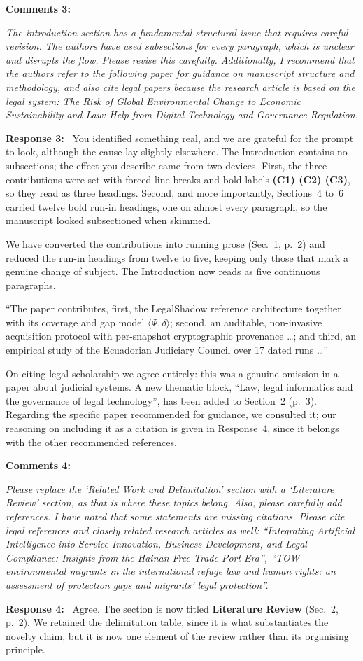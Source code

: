 \documentclass[10pt,a4paper]{article}
\newcommand{\rev}[1]{\textcolor{revred}{#1}}
\newenvironment{revcomment}
  {\begin{mdframed}[backgroundcolor=cmtbg, linecolor=cmtrule, linewidth=0.5pt,
     innertopmargin=5pt, innerbottommargin=5pt, innerleftmargin=7pt,
     innerrightmargin=7pt, skipabove=5pt, skipbelow=5pt]\small\itshape}
  {\end{mdframed}}
\newcommand{\cmt}[2]{\noindent\textbf{Comments #1:}\begin{revcomment}#2\end{revcomment}}
\newcommand{\rsp}[1]{\noindent\textbf{Response #1:}\ }
\begin{document}
\cmt{3}{The introduction section has a fundamental structural issue that requires careful revision. The authors have used subsections for every paragraph, which is unclear and disrupts the flow. Please revise this carefully. Additionally, I recommend that the authors refer to the following paper for guidance on manuscript structure and methodology, and also cite legal papers because the research article is based on the legal system: \emph{The Risk of Global Environmental Change to Economic Sustainability and Law: Help from Digital Technology and Governance Regulation}.}
\rsp{3} You identified something real, and we are grateful for the prompt to look, although the cause lay slightly elsewhere. The Introduction contains no subsections; the effect you describe came from two devices. First, the three contributions were set with forced line breaks and bold labels \textbf{(C1) (C2) (C3)}, so they read as three headings. Second, and more importantly, Sections~4 to~6 carried twelve bold run-in headings, one on almost every paragraph, so the manuscript looked subsectioned when skimmed.

We have converted the contributions into running prose (Sec.~1, p.~2) and reduced the run-in headings from twelve to five, keeping only those that mark a genuine change of subject. The Introduction now reads as five continuous paragraphs.

\rev{``The paper contributes, first, the LegalShadow reference architecture together with its coverage and gap model $\langle\Psi,\delta\rangle$; second, an auditable, non-invasive acquisition protocol with per-snapshot cryptographic provenance \dots; and third, an empirical study of the Ecuadorian Judiciary Council over 17 dated runs \dots''}

On citing legal scholarship we agree entirely: this was a genuine omission in a paper about judicial systems. A new thematic block, ``Law, legal informatics and the governance of legal technology'', has been added to Section~2 (p.~3). Regarding the specific paper recommended for guidance, we consulted it; our reasoning on including it as a citation is given in Response~4, since it belongs with the other recommended references.

\cmt{4}{Please replace the `Related Work and Delimitation' section with a `Literature Review' section, as that is where these topics belong. Also, please carefully add references. I have noted that some statements are missing citations. Please cite legal references and closely related research articles as well: ``Integrating Artificial Intelligence into Service Innovation, Business Development, and Legal Compliance: Insights from the Hainan Free Trade Port Era'', ``TOW environmental migrants in the international refuge law and human rights: an assessment of protection gaps and migrants' legal protection''.}
\rsp{4} Agree. The section is now titled \textbf{Literature Review} (Sec.~2, p.~2). We retained the delimitation table, since it is what substantiates the novelty claim, but it is now one element of the review rather than its organising principle.
\end{document}
